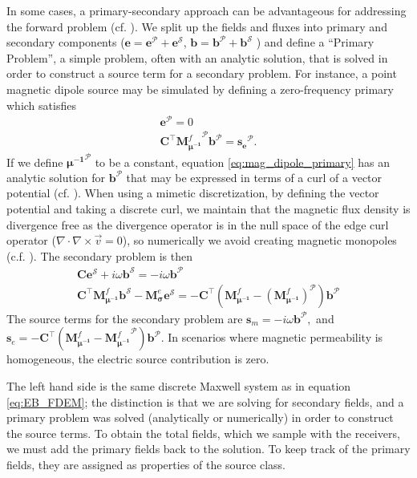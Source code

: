 \documentclass[preprint,review,3p,times,onecolumn,authoryear]{elsarticle}
\newcommand{\sm}{\mathbf{s}_m}
\newcommand{\se}{\mathbf{s}_e}
\newcommand{\dcurl}{{\mathbf C}}
\newcommand{\M}{{\mathbf M}}
\newcommand{\MfMui}{{\M^f_{\boldsymbol{\mu^{-1}}}}}
\newcommand{\MeSigma}{{\M^e_{\boldsymbol{\sigma}}}}
\newcommand{\mui}{\mu^{-1}}
\begin{document}
In some cases, a primary-secondary approach can be advantageous for addressing
the forward problem (cf. \cite{Coggon1971, Haber2014a, Heagy2015}). We split up the fields
and fluxes into primary and secondary components ($\mathbf{e} =
\mathbf{e}^\mathcal{P} + \mathbf{e}^\mathcal{S}$, $\mathbf{b} =
\mathbf{b}^\mathcal{P} + \mathbf{b}^\mathcal{S}$ ) and define a ``Primary
Problem'', a simple problem, often with an analytic solution, that is solved
in order to construct a source term for a secondary problem. For instance, a
point magnetic dipole source may be simulated by defining a zero-frequency
primary which satisfies
\begin{equation}
\begin{split}
    \mathbf{e}^\mathcal{P} = 0 \\
           \dcurl^\top \MfMui^\mathcal{P} \mathbf{b}^\mathcal{P} = \mathbf{s_e}^\mathcal{P}.
\end{split}
\label{eq:mag_dipole_primary}
\end{equation}
If we define $\boldsymbol{\mui}^\mathcal{P}$ to be a constant, equation
\ref{eq:mag_dipole_primary} has an analytic solution for
$\mathbf{b}^\mathcal{P}$ that may be expressed in terms of a curl of a vector
potential (cf. \cite{Griffiths2007}). When using a mimetic discretization, by
defining the vector potential and taking a discrete curl, we maintain that the
magnetic flux density is divergence free as the divergence operator is in the
null space of the edge curl operator ($\nabla \cdot \nabla \times \vec{v} = 0$), so
numerically we avoid creating magnetic monopoles (c.f. \cite{Haber2014a}). The
secondary problem is then
\begin{equation}
\begin{split}
\dcurl \mathbf{e}^\mathcal{S} + i \omega \mathbf{b}^\mathcal{S} = - i \omega \mathbf{b}^\mathcal{P} \\
\dcurl^\top \MfMui \mathbf{b}^\mathcal{S} - \MeSigma \mathbf{e}^\mathcal{S} = -\dcurl^\top \left(\MfMui-\left(\MfMui\right)^\mathcal{P}\right)\mathbf{b}^\mathcal{P}
\label{eq:primsecmagdipole}
\end{split}
\end{equation}
The source terms for the secondary problem are $\sm = -i \omega
\mathbf{b}^\mathcal{P},$ and $\se = -\dcurl^\top (\MfMui-\MfMui^\mathcal{P})
\mathbf{b}^\mathcal{P}$. In scenarios where magnetic permeability is homogeneous,
the electric source contribution is zero.

The left hand side is the same discrete Maxwell system as in equation \ref{eq:EB_FDEM};
the  distinction is that we are solving for secondary fields, and a primary
problem was solved (analytically or numerically) in order to construct the
source terms. To obtain the total fields, which we sample with the receivers,
we must add the primary fields back to the solution. To keep track of the
primary fields, they are assigned as properties of the source class.
\end{document}
